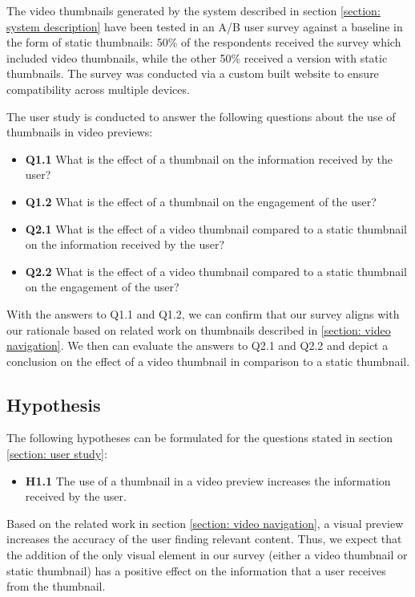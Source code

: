 \documentclass{../resources/sig-alternate-05-2015}
\begin{document}
The video thumbnails generated by the system described in section \ref{section: system description} have been tested in an A/B user survey against a baseline in the form of static thumbnails: 50\% of the respondents received the survey which included video thumbnails, while the other 50\% received a version with static thumbnails. The survey was conducted via a custom built website to ensure compatibility across multiple devices.

The user study is conducted to answer the following questions about the use of thumbnails in video previews:

\begin{itemize}
	\item \textbf{Q1.1} What is the effect of a thumbnail on the information received by the user?
	\item \textbf{Q1.2} What is the effect of a thumbnail on the engagement of the user?
	\item \textbf{Q2.1} What is the effect of a video thumbnail compared to a static thumbnail on the information received by the user?
	\item \textbf{Q2.2} What is the effect of a video thumbnail compared to a static thumbnail on the engagement of the user?
\end{itemize}

With the answers to Q1.1 and Q1.2, we can confirm that our survey aligns with our rationale based on related work on thumbnails described in \ref{section: video navigation}. We then can evaluate the answers to Q2.1 and Q2.2 and depict a conclusion on the effect of a video thumbnail in comparison to a static thumbnail.

\subsection{Hypothesis}

The following hypotheses can be formulated for the questions stated in section \ref{section: user study}:

\begin{itemize}
	\item \textbf{H1.1} The use of a thumbnail in a video preview increases the information received by the user.
\end{itemize}

Based on the related work in section \ref{section: video navigation}, a visual preview increases the accuracy of the user finding relevant content. Thus, we expect that the addition of the only visual element in our survey (either a video thumbnail or static thumbnail) has a positive effect on the information that a user receives from the thumbnail.
\end{document}
